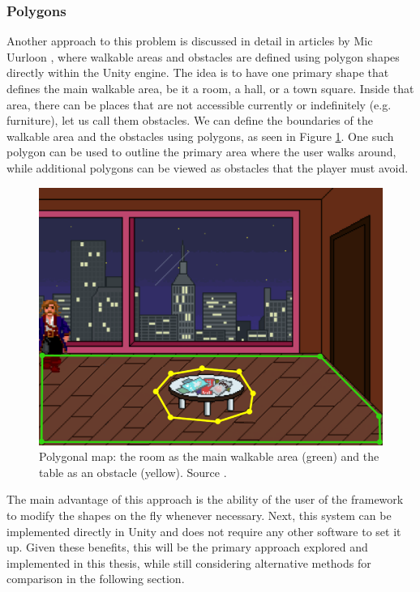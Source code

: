 \subsubsection{Polygons}
\label{Analysis:Polygon}
Another approach to this problem is discussed in detail in articles by Mic Uurloon \cite{Uurloon1}\cite{Uurloon2}, where walkable areas and obstacles are defined using polygon shapes directly within the Unity engine. The idea is to have one primary shape that defines the main walkable area, be it a room, a hall, or a town square. Inside that area, there can be places that are not accessible currently or indefinitely (e.g. furniture), let us call them obstacles. We can define the boundaries of the walkable area and the obstacles using polygons, as seen in Figure \ref{fig:WS:Poly}. One such polygon can be used to outline the primary area where the user walks around, while additional polygons can be viewed as obstacles that the player must avoid.

\begin{figure}[H]
\centering
\includegraphics[width=.7\linewidth]{img/WS-polygons4.png}
\caption{Polygonal map: the room as the main walkable area (green) and the table as an obstacle (yellow). Source \cite{Uurloon1}.}
\label{fig:WS:Poly}
\end{figure}

The main advantage of this approach is the ability of the user of the framework to modify the shapes on the fly whenever necessary. Next, this system can be implemented directly in Unity and does not require any other software to set it up. Given these benefits, this will be the primary approach explored and implemented in this thesis, while still considering alternative methods for comparison in the following section. 

